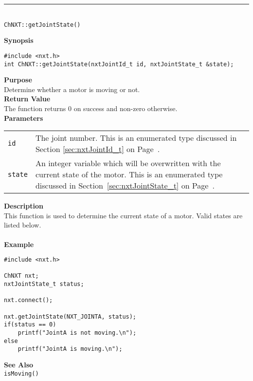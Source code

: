 \noindent
\vspace{5pt}
\rule{4.5in}{0.015in}\\
\noindent
{\LARGE \texttt{ChNXT::getJointState()}}\\
{}

\noindent
{\bf Synopsis}
\begin{lstlisting}
#include <nxt.h>
int ChNXT::getJointState(nxtJointId_t id, nxtJointState_t &state);
\end{lstlisting}

\noindent
{\bf Purpose}\\
Determine whether a motor is moving or not.\\

\noindent
{\bf Return Value}\\
The function returns 0 on success and non-zero otherwise.\\

\noindent
{\bf Parameters}
\vspace{-0.1in}
\begin{description}
\item               
\begin{tabular}{p{10 mm}p{145 mm}}
\texttt{id} & The joint number. This is an enumerated type 
discussed in Section \ref{sec:nxtJointId_t} on Page~\pageref{sec:nxtJointId_t}.\\
\texttt{state} & An integer variable which will be overwritten with the current 
state of the motor. This is an enumerated type discussed in 
Section~\ref{sec:nxtJointState_t} on Page~\pageref{sec:nxtJointState_t}.\\
\end{tabular}
\end{description}

\noindent
{\bf Description}\\
This function is used to determine the current state of a motor. Valid states are listed below.\\
\\


\noindent
{\bf Example}
\begin{lstlisting}
#include <nxt.h>

ChNXT nxt;
nxtJointState_t status;

nxt.connect();

nxt.getJointState(NXT_JOINTA, status);
if(status == 0)
    printf("JointA is not moving.\n");
else
    printf("JointA is moving.\n");
\end{lstlisting}

\noindent
{\bf See Also}\\
\texttt{isMoving()}\\
